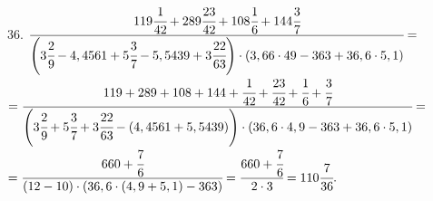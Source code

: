 36. $\cfrac{119\cfrac{1}{42}+289\cfrac{23}{42}+108\cfrac{1}{6}+144\cfrac{3}{7}}
{\left(3\cfrac{2}{9}-4,4561+5\cfrac{3}{7}-5,5439+3\cfrac{22}{63}\right)\cdot
(3,66\cdot49-363+36,6\cdot5,1)}=$\\$=\cfrac{119+289+108+144+\cfrac{1}{42}+\cfrac{23}{42}+\cfrac{1}{6}+\cfrac{3}{7}}
{\left(3\cfrac{2}{9}+5\cfrac{3}{7}+3\cfrac{22}{63}-(4,4561+5,5439)\right)\cdot
(36,6\cdot4,9-363+36,6\cdot5,1)}=$\\$=\cfrac{660+\cfrac{7}{6}}
{\left(12-10\right)\cdot(36,6\cdot(4,9+5,1)-363)}=\cfrac{660+\cfrac{7}{6}}{2\cdot3}=110\cfrac{7}{36}.$\\
